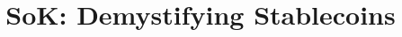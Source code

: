 \documentclass[runningheads]{llncs}
\begin{document}
%
\title{SoK: Demystifying Stablecoins}
%



\author{}
\institute{}
\maketitle              %
%





%
%
%
 

%
\end{document}
